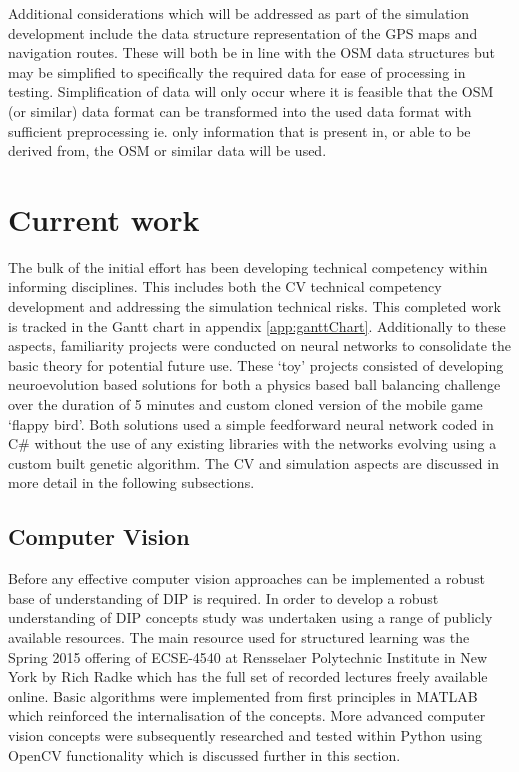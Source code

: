 \documentclass[]{aiaa-tc}%
\begin{document}
Additional considerations which will be addressed as part of the simulation development include the data structure representation of the GPS maps and navigation routes. These will both be in line with the OSM data structures but may be simplified to specifically the required data for ease of processing in testing. Simplification of data will only occur where it is feasible that the OSM (or similar) data format can be transformed into the used data format with sufficient preprocessing ie. only information that is present in, or able to be derived from, the OSM or similar data will be used.

\section{Current work}\label{s:currentWork}

The bulk of the initial effort has been developing technical competency within informing disciplines. This includes both the CV technical competency development and addressing the simulation technical risks. This completed work is tracked in the Gantt chart in appendix \ref{app:ganttChart}. Additionally to these aspects, familiarity projects were conducted on neural networks to consolidate the basic theory for potential future use. These `toy' projects consisted of developing neuroevolution based solutions for both a physics based ball balancing challenge over the duration of 5 minutes and custom cloned version of the mobile game `flappy bird'. Both solutions used a simple feedforward neural network coded in C\# without the use of any existing libraries with the networks evolving using a custom built genetic algorithm. The CV and simulation aspects are discussed in more detail in the following subsections. 

\subsection{Computer Vision}\label{s:currentWork_CV}

Before any effective computer vision approaches can be implemented a robust base of understanding of DIP is required. In order to develop a robust understanding of DIP concepts study was undertaken using a range of publicly available resources. The main resource used for structured learning was the Spring 2015 offering of ECSE-4540 at Rensselaer Polytechnic Institute in New York by Rich Radke which has the full set of recorded lectures freely available online. Basic algorithms were implemented from first principles in MATLAB which reinforced the internalisation of the concepts. More advanced computer vision concepts were subsequently researched and tested within Python using OpenCV functionality which is discussed further in this section. 
\end{document}
